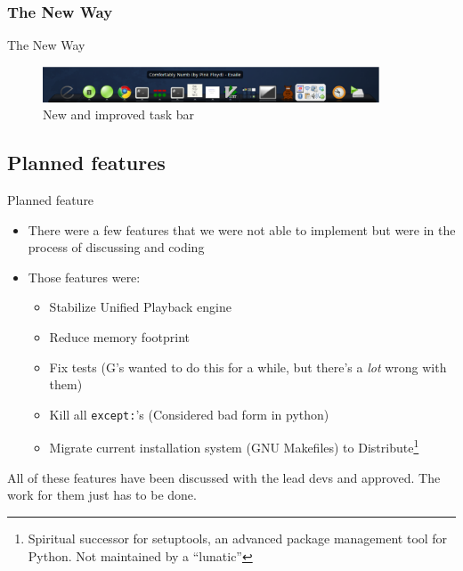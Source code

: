 \documentclass{beamer}
\begin{document}
\subsubsection{The New Way}
\begin{frame}{The New Way}
  \begin{figure}
    \centering
    \includegraphics[width=100mm]{images/awn-new}
    \caption{New and improved task bar}
  \end{figure}
\end{frame}

\subsection{Planned features}
\begin{frame}{Planned feature}
  \begin{itemize}
    \item There were a few features that we were not able to implement but
      were in the process of discussing and coding
    \item Those features were:
    \begin{itemize}
      \item Stabilize Unified Playback engine
      \item Reduce memory footprint
      \item Fix tests (G's wanted to do this for a while, but there's a
        \emph{lot} wrong with them)
      \item Kill all \lstinline!except:!'s (Considered bad form in python)
      \item Migrate current installation system (GNU Makefiles) to
        Distribute\footnote{Spiritual successor for setuptools, an advanced
        package management tool for Python. Not maintained by a ``lunatic''}
    \end{itemize}
  \end{itemize}
  All of these features have been discussed with the lead devs and approved.
  The work for them just has to be done.
\end{frame}
\end{document}
